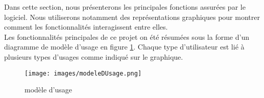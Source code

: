 Dans cette section, nous présenterons les principales fonctions assurées par le logiciel. Nous utiliserons notamment des représentations graphiques pour montrer comment les fonctionnalités interagissent entre elles.\\




Les fonctionnalités principales de ce projet on été résumées sous la forme d'un diagramme de modèle d'usage en figure \ref{mod_use}. Chaque type d'utilisateur est lié à plusieurs types d'usages comme indiqué sur le graphique.

\begin{figure}[h!]
	\centering
	\texttt{[image: images/modeleDUsage.png]}
	\caption{\label{mod_use} modèle d'usage}
\end{figure}
